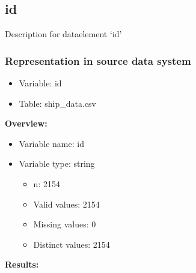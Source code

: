 \documentclass[
]{article}
\providecommand{\tightlist}{%
  \setlength{\itemsep}{0pt}\setlength{\parskip}{0pt}}
\begin{document}
\newpage

\hypertarget{id}{%
\subsection{id}\label{id}}

Description for dataelement `id'

\hypertarget{representation-in-source-data-system-14}{%
\subsubsection{\texorpdfstring{Representation in \textbf{source} data
system}{Representation in source data system}}\label{representation-in-source-data-system-14}}

\begin{itemize}
\tightlist
\item
  Variable: id
\item
  Table: ship\_data.csv
\end{itemize}

\textbf{Overview:}

\begin{itemize}
\tightlist
\item
  Variable name: id
\item
  Variable type: string

  \begin{itemize}
  \tightlist
  \item
    n: 2154
  \item
    Valid values: 2154
  \item
    Missing values: 0
  \item
    Distinct values: 2154
  \end{itemize}
\end{itemize}

\textbf{Results:}\\
\end{document}
